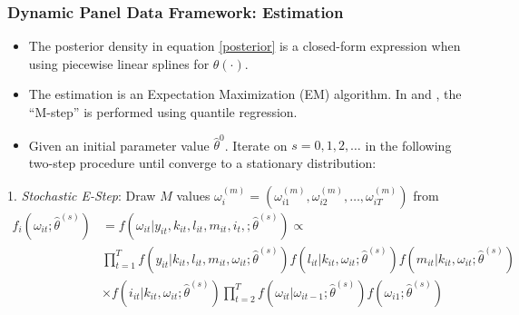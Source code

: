 \documentclass{beamer}
\begin{document}
\begin{frame}
\frametitle{Dynamic Panel Data Framework: Estimation}
\begin{itemize}
	\item The posterior density in equation \eqref{posterior} is a closed-form expression when using piecewise linear splines for $\theta(\cdot)$. 
	\item The estimation is an Expectation Maximization (EM) algorithm. In \cite{Arellano2016} and \cite{Arellano2017}, the ``M-step'' is performed using quantile regression. 
	\item Given an initial parameter value $\hat{\theta}^{0}$. Iterate on $s=0,1,2,\dots$ in the following two-step procedure until converge to a stationary distribution:
\end{itemize}
1. \textit{Stochastic E-Step}: Draw $M$ values $\omega_{i}^{(m)}=(\omega_{i1}^{(m)}, \omega_{i2}^{(m)},\dots, \omega_{iT}^{(m)})$ from
\small
        \begin{equation*}
        \begin{split}
            f_{i}(\omega_{it};\hat{\theta}^{(s)})&=f(\omega_{it}|y_{it}, k_{it}, l_{it}, m_{it}, i_{t},; \hat{\theta}^{(s)}) \propto\\
            &\prod_{t=1}^{T}f(y_{it}|k_{it}, l_{it}, m_{it}, \omega_{it};\hat{\theta}^{(s)})f(l_{it}|k_{it}, \omega_{it};\hat{\theta}^{(s)})f(m_{it}|k_{it}, \omega_{it};\hat{\theta}^{(s)}) \\
            &\times f(i_{it}|k_{it}, \omega_{it};\hat{\theta}^{(s)})\prod_{t=2}^{T}f(\omega_{it}|\omega_{it-1};\hat{\theta}^{(s)})f(\omega_{i1};\hat{\theta}^{(s)})
            \end{split}
        \end{equation*}
\end{frame}

\end{document}
